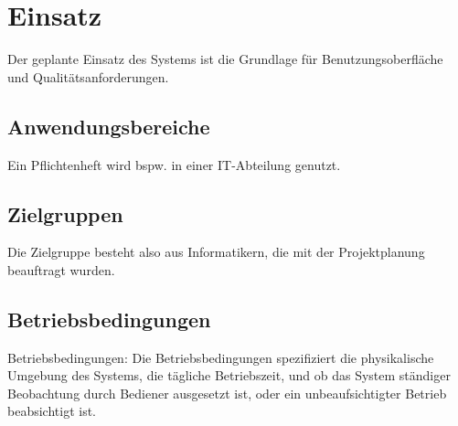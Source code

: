  \chapter{Einsatz}
Der geplante Einsatz des Systems ist die Grundlage für Benutzungsoberfläche und
Qualitätsanforderungen.
 
\section{Anwendungsbereiche}
Ein Pflichtenheft wird bspw. in einer IT-Abteilung genutzt.
 
\section{Zielgruppen}
Die Zielgruppe besteht also aus Informatikern, die mit der Projektplanung
beauftragt wurden.
 
\section{Betriebsbedingungen}
Betriebsbedingungen: Die Betriebsbedingungen spezifiziert die physikalische
Umgebung des Systems, die tägliche Betriebszeit, und ob das System ständiger
Beobachtung durch Bediener ausgesetzt ist, oder ein unbeaufsichtigter Betrieb
beabsichtigt ist.

